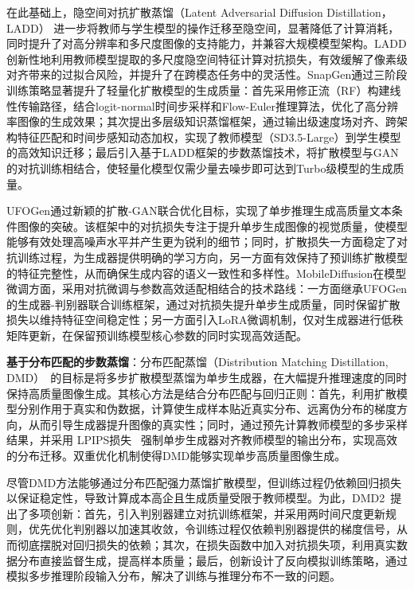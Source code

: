 \documentclass[11pt,a4paper,UTF8]{ctexart}
\begin{document}
在此基础上，隐空间对抗扩散蒸馏（Latent Adversarial Diffusion Distillation，LADD）\cite{sauer2024fast} 进一步将教师与学生模型的操作迁移至隐空间，显著降低了计算消耗，同时提升了对高分辨率和多尺度图像的支持能力，并兼容大规模模型架构。LADD创新性地利用教师模型提取的多尺度隐空间特征计算对抗损失，有效缓解了像素级对齐带来的过拟合风险，并提升了在跨模态任务中的灵活性。SnapGen\cite{hu2024snapgen}通过三阶段训练策略显著提升了轻量化扩散模型的生成质量：首先采用修正流（RF）\cite{liu2022flow}构建线性传输路径，结合logit-normal时间步采样和Flow-Euler推理算法，优化了高分辨率图像的生成效果；其次提出多层级知识蒸馏框架，通过输出级速度场对齐、跨架构特征匹配和时间步感知动态加权，实现了教师模型（SD3.5-Large）到学生模型的高效知识迁移；最后引入基于LADD框架\cite{sauer2024fast}的步数蒸馏技术，将扩散模型与GAN的对抗训练相结合，使轻量化模型仅需少量去噪步即可达到Turbo级模型的生成质量。

UFOGen\cite{xu2024ufogen}通过新颖的扩散-GAN联合优化目标，实现了单步推理生成高质量文本条件图像的突破。该框架中的对抗损失专注于提升单步生成图像的视觉质量，使模型能够有效处理高噪声水平并产生更为锐利的细节；同时，扩散损失一方面稳定了对抗训练过程，为生成器提供明确的学习方向，另一方面有效保持了预训练扩散模型的特征完整性，从而确保生成内容的语义一致性和多样性。MobileDiffusion\cite{zhao2024mobilediffusion}在模型微调方面，采用对抗微调与参数高效适配相结合的技术路线：一方面继承UFOGen\cite{xu2024ufogen}的生成器-判别器联合训练框架，通过对抗损失提升单步生成质量，同时保留扩散损失以维持特征空间稳定性；另一方面引入LoRA\cite{hu2022lora}微调机制，仅对生成器进行低秩矩阵更新，在保留预训练模型核心参数的同时实现高效适配。

\textbf{基于分布匹配的步数蒸馏}：分布匹配蒸馏（Distribution Matching Distillation, DMD）~\cite{yin2024one}的目标是将多步扩散模型蒸馏为单步生成器，在大幅提升推理速度的同时保持高质量图像生成。其核心方法是结合分布匹配与回归正则：首先，利用扩散模型分别作用于真实和伪数据，计算使生成样本贴近真实分布、远离伪分布的梯度方向，从而引导生成器提升图像的真实性；同时，通过预先计算教师模型的多步采样结果，并采用 LPIPS损失~\cite{zhang2018unreasonable} 强制单步生成器对齐教师模型的输出分布，实现高效的分布迁移。双重优化机制使得DMD能够实现单步高质量图像生成。

尽管DMD方法能够通过分布匹配强力蒸馏扩散模型，但训练过程仍依赖回归损失以保证稳定性，导致计算成本高企且生成质量受限于教师模型。为此，DMD2~\cite{yin2024improved}提出了多项创新：首先，引入判别器建立对抗训练框架，并采用两时间尺度更新规则，优先优化判别器以加速其收敛，令训练过程仅依赖判别器提供的梯度信号，从而彻底摆脱对回归损失的依赖；其次，在损失函数中加入对抗损失项，利用真实数据分布直接监督生成，提高样本质量；最后，创新设计了反向模拟训练策略，通过模拟多步推理阶段输入分布，解决了训练与推理分布不一致的问题。
\end{document}
